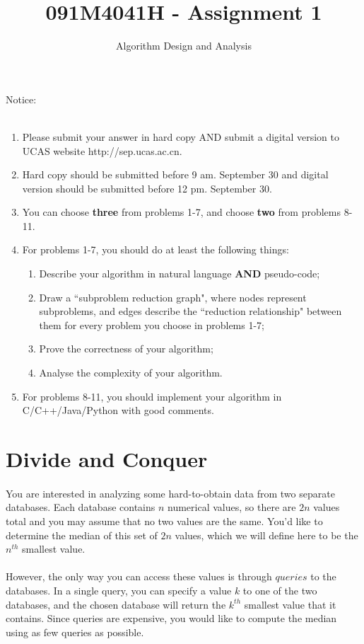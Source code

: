 \documentclass[a4paper,11pt]{article}
\title{091M4041H - Assignment 1}
\author{Algorithm Design and Analysis}
\begin{document}
\maketitle

Notice:\\\\
\begin{enumerate}
\item Please submit your answer in hard copy AND submit a digital version to UCAS website http://sep.ucas.ac.cn.
\item Hard copy should be submitted before 9  am. September 30 and digital version should be submitted before 12 pm. September 30.
\item You can choose \textbf{three} from problems 1-7, and choose \textbf{two} from problems 8-11.
\item For problems 1-7, you should do at least the following things:
\begin{enumerate}
 \item Describe your algorithm in natural language \textbf{AND} pseudo-code;
 \item Draw a ``subproblem reduction graph", where nodes represent subproblems, and edges describe the ``reduction relationship" between them for every problem you choose in problems 1-7;
 \item Prove the correctness of your algorithm;
 \item Analyse the complexity of your algorithm.
\end{enumerate}
\item For problems 8-11, you should implement your algorithm in C/C++/Java/Python with good comments.
\end{enumerate}


\section{Divide and Conquer}

\paragraph{} You are interested in analyzing some hard-to-obtain data from two separate databases. Each database contains $n$ numerical values, so there are $2n$ values total and you may assume that no two values are the same. You'd like to determine the median of this set of $2n$ values, which we will define here to be the $n^{th}$ smallest value.

\paragraph{}However, the only way you can access these values is through $queries$ to the databases. In a single query, you can specify a value $k$ to one of the two databases, and the chosen database will return the $k^{th}$ smallest value that it contains. Since queries are expensive, you would like to compute the median using as few queries as possible.
\end{document}
